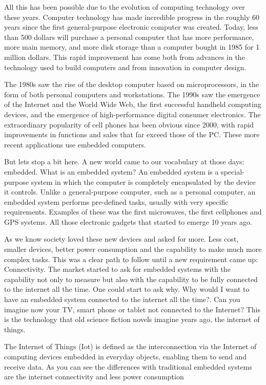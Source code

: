 All this has been possible due to the evolution of computing technology over
these years. Computer technology has made incredible progress in the roughly 60
years since the first general-purpose electronic computer was created. Today,
less than 500 dollars  will purchase a personal computer that has more
performance, more main memory, and more disk storage than a computer bought in
1985 for 1 million dollars. This rapid improvement has come both from advances
in the technology used to build computers and from innovation in computer
design.

The 1980s saw the rise of the desktop computer based on microprocessors, in the
form of both personal computers and workstations. The 1990s saw the emergence
of the Internet and the World Wide Web, the first successful handheld computing
devices, and the emergence of high-performance digital consumer electronics.
The extraordinary popularity of cell phones has been obvious since 2000, with
rapid improvements in functions and sales that far exceed those of the PC.
These more recent applications use embedded computers.

But lets stop a bit here. A new world came to our vocabulary at those days:
embedded. What is an embedded system? An embedded system is a special-purpose
system in which the computer is completely encapsulated by the device it
controls. Unlike a general-purpose computer, such as a personal computer, an
embedded system performs pre-defined tasks, usually with very specific
requirements. Examples of these was the first microwaves, the first cellphones
and GPS systems. All those electronic gadgets that started to emerge 10 years
ago.

As we know society loved these new devices and asked for more. Less cost, 
smaller devices, better power consumption and the capability to make much more
complex tasks. This was a clear path to follow until a new requirement came up:
Connectivity. The market started to ask for embedded systems with the capability
not only to measure but also with the capability to be fully connected to the
internet all the time. One could start to ask why. Why would I want to have an
embedded system connected to the internet all the time?. Can you imagine now
your TV, smart phone or tablet not connected to the Internet? This is the
technology that old science fiction novels imagine years ago, the internet of
things.

The Internet of Things (Iot) is defined as the interconnection via the Internet
of computing devices embedded in everyday objects, enabling them to send and
receive data. As you can see the differences with traditional embedded systems
are the internet connectivity and less power consumption

